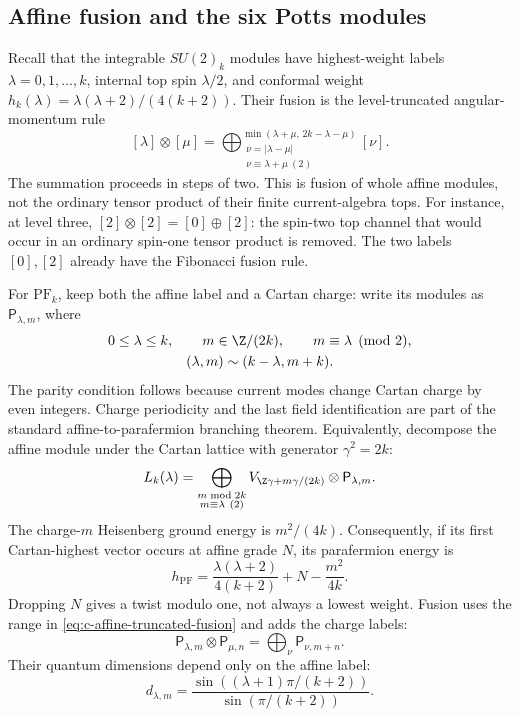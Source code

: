 \subsection{Affine fusion and the six Potts modules}
\label{sec:c-affine-pf-labels}
Recall that the integrable $SU(2)_k$ modules have highest-weight
labels $\lambda=0,1,\ldots,k$, internal top spin $\lambda/2$,
and conformal weight
$h_k(\lambda)=\lambda(\lambda+2)/(4(k+2))$.
Their fusion is the level-truncated angular-momentum rule
\begin{equation}\label{eq:c-affine-truncated-fusion}
 [\lambda]\otimes[\mu]
 =\bigoplus_{\substack{\nu=|\lambda-\mu|\\
                       \nu\equiv\lambda+\mu\ (2)}}
              ^{\min(\lambda+\mu,\,2k-\lambda-\mu)}[\nu].
\end{equation}
The summation proceeds in steps of two. This is fusion of whole
affine modules, not the ordinary tensor product of their finite
current-algebra tops. For instance, at level three,
$[2]\otimes[2]=[0]\oplus[2]$: the spin-two top channel that would
occur in an ordinary spin-one tensor product is removed. The
two labels $[0],[2]$ already have the Fibonacci fusion rule.

For $\mathrm{PF}_k$, keep both the affine label and a Cartan charge:
write its modules as $\mathsf P_{\lambda,m}$, where
\begin{equation}\label{eq:c-pf-label-identification}
\begin{gathered}
 0\le\lambda\le k,\qquad m\in\Z/(2k),\qquad
 m\equiv\lambda\pmod2,\\
 (\lambda,m)\sim(k-\lambda,m+k).
\end{gathered}
\end{equation}
The parity condition follows because current modes change Cartan
charge by even integers. Charge periodicity and the last field
identification are part of the standard affine-to-parafermion
branching theorem. Equivalently, decompose the affine module under
the Cartan lattice with generator $\gamma^2=2k$:
\[
 L_k(\lambda)=
 \bigoplus_{\substack{m\bmod2k\\m\equiv\lambda\ (2)}}
 V_{\Z\gamma+m\gamma/(2k)}\otimes\mathsf P_{\lambda,m}.
\]
The charge-$m$ Heisenberg ground energy is $m^2/(4k)$.
Consequently, if its first Cartan-highest vector occurs at affine
grade $N$, its parafermion energy is
\begin{equation}\label{eq:c-pf-energy-subtraction}
 h_{\mathrm{PF}}=\frac{\lambda(\lambda+2)}{4(k+2)}
                         +N-\frac{m^2}{4k}.
\end{equation}
Dropping $N$ gives a twist modulo one, not always a lowest weight.
Fusion uses the range in \eqref{eq:c-affine-truncated-fusion} and
adds the charge labels:
\[
 \mathsf P_{\lambda,m}\otimes\mathsf P_{\mu,n}
   =\bigoplus_{\nu}\mathsf P_{\nu,m+n}.
\]
Their quantum dimensions depend only on the affine label:
\[
 d_{\lambda,m}
 =\frac{\sin((\lambda+1)\pi/(k+2))}{\sin(\pi/(k+2))}.
\]

